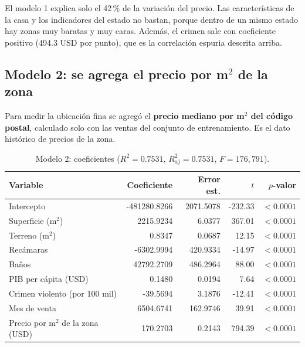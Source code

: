 \documentclass[12pt,letterpaper]{article}
\begin{document}
El modelo 1 explica solo el 42\,\% de la variación del precio. Las características de la casa y los indicadores del estado no bastan, porque dentro de un mismo estado hay zonas muy baratas y muy caras. Además, el crimen sale con coeficiente positivo (494.3 USD por punto), que es la correlación espuria descrita arriba.

\subsection{Modelo 2: se agrega el precio por m$^2$ de la zona}

Para medir la ubicación fina se agregó el \textbf{precio mediano por m$^2$ del código postal}, calculado solo con las ventas del conjunto de entrenamiento. Es el dato histórico de precios de la zona.

\begin{table}[H]
\centering
\caption{Modelo 2: coeficientes ($R^2 = 0.7531$, $R^2_{aj} = 0.7531$, $F = 176,791$).}
\small
\begin{tabular}{lrrrr}
\toprule
Variable & Coeficiente & Error est. & $t$ & $p$-valor \\
\midrule
Intercepto & -481280.8266 & 2071.5078 & -232.33 & $<0.0001$ \\
Superficie (m$^2$) & 2215.9234 & 6.0377 & 367.01 & $<0.0001$ \\
Terreno (m$^2$) & 0.8347 & 0.0687 & 12.15 & $<0.0001$ \\
Recámaras & -6302.9994 & 420.9334 & -14.97 & $<0.0001$ \\
Baños & 42792.2709 & 486.2964 & 88.00 & $<0.0001$ \\
PIB per cápita (USD) & 0.1480 & 0.0194 & 7.64 & $<0.0001$ \\
Crimen violento (por 100 mil) & -39.5694 & 3.1876 & -12.41 & $<0.0001$ \\
Mes de venta  & 6504.6741 & 162.9746 & 39.91 & $<0.0001$ \\
Precio por m$^2$ de la zona (USD) & 170.2703 & 0.2143 & 794.39 & $<0.0001$ \\
\bottomrule
\end{tabular}
\end{table}
\end{document}
